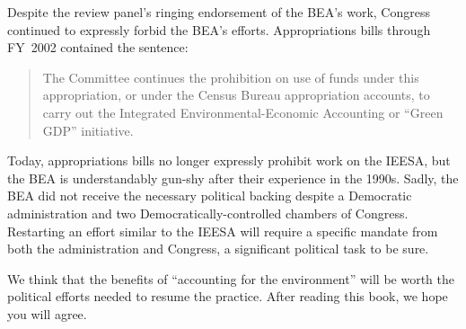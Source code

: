 Despite the review panel's ringing endorsement of the BEA's work,
Congress continued to expressly forbid the BEA's efforts.
Appropriations bills through FY~2002 contained the sentence:

\begin{quote}
	The Committee continues the prohibition on use of funds under this appropriation,
	or under the Census Bureau appropriation accounts,
	to carry out the Integrated Environmental-Economic Accounting or ``Green GDP'' initiative.
\end{quote}

Today, appropriations bills no longer expressly prohibit work on the IEESA,
but the BEA is understandably gun-shy after their experience in the 1990s.
Sadly, the BEA did not receive the necessary political backing
despite a Democratic administration
and two Democratically-controlled chambers of Congress.
Restarting an effort similar to the IEESA will require a specific
mandate from both the administration and Congress, 
a significant political task to be sure.

We think that the benefits of ``accounting for the environment''
will be worth the political efforts needed
to resume the practice.
After reading this book, we hope you will agree.


% 
% 
% 
% 

